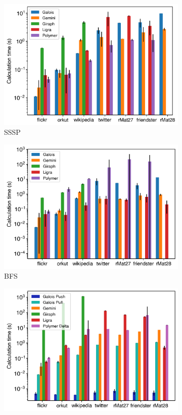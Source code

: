 \documentclass{meetings}
\begin{document}
\begin{figure}[h]
	\begin{subfigure}{0.32\textwidth}
		\includegraphics[width=\linewidth]{../../plots/singleNodeSSSP_calcTime.png}
		\caption{SSSP}
	\end{subfigure}
	\begin{subfigure}{0.32\textwidth}
		\includegraphics[width=\linewidth]{../../plots/singleNodeBFS_calcTime.png}
		\caption{BFS}
	\end{subfigure}
	\begin{subfigure}{0.32\textwidth}
		\includegraphics[width=\linewidth]{../../plots/singleNodePR_calcTime.png}

\end{subfigure}
\end{figure}
\end{document}
